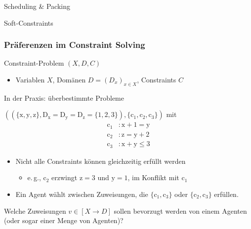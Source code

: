\documentclass[handout,10pt,xcolor={dvipsnames},fleqn]{beamer}
\newcommand{\cemph}[1]{\alert{#1}}
\begin{document}
\begin{frame}{Scheduling \& Packing}

\end{frame}

\begin{frame}{Soft-Constraints}

\end{frame}


\begin{frame}
\frametitle{Präferenzen im Constraint Solving}

Constraint-Problem $(X, D, C)$ 
\begin{itemize}
  \item \cemph{Variablen} $X$,
\cemph{Domänen} $D = (D_x)_{x \in X}$,
\cemph{Constraints} $C$
\end{itemize}

\vspace*{1ex}

In der Praxis: \cemph{überbestimmte} Probleme

\vspace*{2ex}

$((\{ \mathrm{x}, \mathrm{y}, \mathrm{z} \},
\mathrm{D}_{\mathrm{x}} = \mathrm{D}_{\mathrm{y}} =
\mathrm{D}_{\mathrm{z}} = \{ 1, 2, 3 \}), \{ \mathrm{c}_1,
\mathrm{c}_2, \mathrm{c}_3 \})$ mit 
\bgroup{}
\begin{align*}
  \mathrm{c}_1 &: \mathrm{x} + 1 = \mathrm{y}
\\[-.4ex]
  \mathrm{c}_2 &: \mathrm{z} = \mathrm{y} + 2
\\[-.4ex]
  \mathrm{c}_3 &: \mathrm{x} + \mathrm{y} \leq 3
\end{align*}
\egroup

\begin{itemize}
  \item Nicht alle Constraints können gleichzeitig erfüllt werden
\begin{itemize} \pause
  \item e.\,g., $\mathrm{c}_2$ erzwingt $\mathrm{z} = 3$ und $\mathrm{y} = 1$, im Konflikt mit $\mathrm{c}_1$
\end{itemize}

  \item Ein Agent \cemph{wählt} zwischen Zuweisungen, die $\{ \mathrm{c}_1, \mathrm{c}_3 \}$ oder $\{ \mathrm{c}_2, \mathrm{c}_3 \}$ erfüllen.
\end{itemize}

\vspace*{2ex}

Welche Zuweisungen $v \in [X \to D]$ sollen \alert{bevorzugt} werden von einem Agenten (oder sogar einer Menge von Agenten)?

\end{frame}
\end{document}

